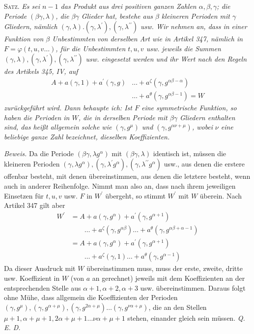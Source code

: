 \clearpage
{}
\textsc{Satz.} \textit{Es sei \(n-1\) das Produkt aus drei positiven ganzen Zahlen \(\alpha,\allowbreak \beta,\allowbreak \gamma\); die} \textit{Periode \((\beta\gamma,\lambda)\), die \(\beta\gamma\) Glieder hat, bestehe aus \(\beta\) kleineren Perioden mit \(\gamma\) Gliedern,} \textit{nämlich \((\gamma,\lambda).(\gamma,\lambda^{\prime}),\allowbreak (\gamma,\lambda^{\prime\prime})\) usw. Wir nehmen an, dass in einer Funktion von \(\beta\) Unbestimmten} \textit{von derselben Art wie in Artikel 347, nämlich in \(F=\varphi(t,u,v\ldots)\), für die Unbestimmten \(t,\allowbreak u,\allowbreak v\) usw.} \textit{jeweils die Summen \((\gamma,\lambda),\allowbreak (\gamma,\lambda^{\prime}),\allowbreak (\gamma,\lambda^{\prime\prime})\) usw. eingesetzt werden und ihr Wert nach den Regeln des} \textit{Artikels 345, IV, auf} \[\begin{aligned}
A+a(\gamma,1)+a^{\prime}(\gamma,g)&\ldots+a^\zeta(\gamma,g^{\alpha\beta-\alpha})\\
&\ldots+a^\theta(\gamma,g^{\alpha\beta-1})=W
\end{aligned}\] \textit{zurückgeführt wird. Dann behaupte ich: Ist \(F\) eine symmetrische Funktion, so haben die Perioden in \(W\), die in derselben Periode} \textit{mit \(\beta\gamma\) Gliedern enthalten sind, \textit{das heißt} allgemein solche wie \((\gamma,g^\mu)\) und \((\gamma,g^{\alpha\nu+\mu})\), wobei} \textit{\(\nu\) eine beliebige ganze Zahl bezeichnet, dieselben Koeffizienten.}

\textit{Beweis.} Da die Periode \((\beta\gamma,\lambda g^\alpha)\) mit \((\beta\gamma,\lambda)\) identisch ist, müssen die kleineren Perioden \((\gamma,\lambda g^\alpha),\allowbreak (\gamma,\lambda^{\prime}g^\alpha),\allowbreak (\gamma,\lambda^{\prime\prime}g^\alpha)\) usw., aus denen die erstere offenbar besteht, mit denen übereinstimmen, aus denen die letztere besteht, wenn auch in anderer Reihenfolge. Nimmt man also an, dass nach ihrem jeweiligen Einsetzen für \(t,\allowbreak u,\allowbreak v\) usw. \(F\) in \(W^{\prime}\) übergeht, so stimmt \(W^{\prime}\) mit \(W\) überein. Nach Artikel 347 gilt aber \[\begin{aligned}
W^{\prime}&=A+a(\gamma,g^\alpha)+a^{\prime}(\gamma,g^{\alpha+1})\\
&\qquad\ldots+a^\zeta(\gamma,g^{\alpha\beta})\ldots+a^\theta(\gamma,g^{\alpha\beta+\alpha-1})\\
&=A+a(\gamma,g^\alpha)+a^{\prime}(\gamma,g^{\alpha+1})\\
&\qquad\ldots+a^\zeta(\gamma,1)\ldots+a^\theta(\gamma,g^{\alpha-1})
\end{aligned}\] Da dieser Ausdruck mit \(W\) übereinstimmen muss, muss der erste, zweite, dritte usw. Koeffizient in \(W\) (von \(a\) an gerechnet) jeweils mit dem Koeffizienten an der entsprechenden Stelle aus \(\alpha+1,\allowbreak \alpha+2,\allowbreak \alpha+3\) usw. übereinstimmen. Daraus folgt ohne Mühe, dass allgemein die Koeffizienten der Perioden \((\gamma,g^\mu),\allowbreak (\gamma,g^{\alpha+\mu}),\allowbreak (\gamma,g^{2\alpha+\mu})\ldots(\gamma,g^{\nu\alpha+\mu})\), die an den Stellen \(\mu+1,\allowbreak \alpha+\mu+1,\allowbreak 2\alpha+\mu+1\ldots\nu\alpha+\mu+1\) stehen, einander gleich sein müssen. \textit{Q. E. D.}

